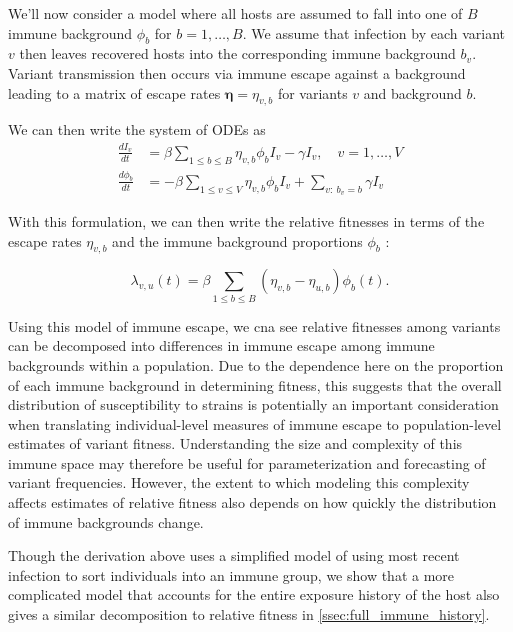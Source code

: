 \documentclass[12pt,oneside,letterpaper]{article}
\renewcommand{\vec}[1]{\boldsymbol{#1}}
\begin{document}
We'll now consider a model where all hosts are assumed to fall into one of $B$ immune background $\phi_{b}$ for $b =1, \ldots, B$.
We assume that infection by each variant $v$ then leaves recovered hosts into the corresponding immune background $b_{v}$.
Variant transmission then occurs via immune escape against a background leading to a matrix of escape rates $\vec{\eta} = \eta_{v,b}$ for variants $v$ and background $b$.

We can then write the system of ODEs as 
\begin{align*}
    \frac{d I_{v}}{dt} &= \beta \sum_{1\leq b \leq B} \eta_{v, b} \phi_{b} I_{v} - \gamma I_{v}, \quad v = 1, \ldots, V\\
    \frac{d \phi_{b}}{dt} &= - \beta \sum_{1\leq v \leq V} \eta_{v,b}\phi_{b} I_{v} +  \sum_{v:\ b_{v} = b} \gamma I_{v}
\end{align*}

With this formulation, we can then write the relative fitnesses in terms of the escape rates $\eta_{v,b}$ and the immune background proportions $\phi_{b}$ :

\begin{equation} \label{eq:escape_relative_fitness}
    \lambda_{v, u}(t) = \beta \sum_{1\leq b \leq B}(\eta_{v,b} - \eta_{u,b}) \phi_{b}(t).
\end{equation}

Using this model of immune escape, we cna see relative fitnesses among variants can be decomposed into differences in immune escape among immune backgrounds within a population.
Due to the dependence here on the proportion of each immune background in determining fitness, this suggests that the overall distribution of susceptibility to strains is potentially an important consideration when translating individual-level measures of immune escape to population-level estimates of variant fitness.
Understanding the size and complexity of this immune space may therefore be useful for parameterization and forecasting of variant frequencies.
However, the extent to which modeling this complexity affects estimates of relative fitness also depends on how quickly the distribution of immune backgrounds change.

Though the derivation above uses a simplified model of using most recent infection to sort individuals into an immune group, we show that a more complicated model that accounts for the entire exposure history of the host also gives a similar decomposition to relative fitness in \ref{ssec:full_immune_history}.
\end{document}
